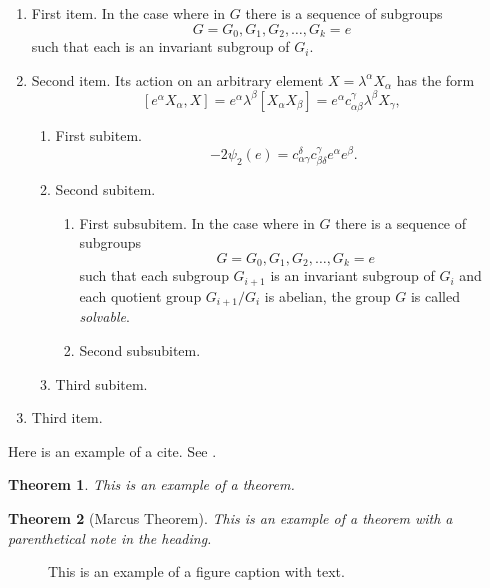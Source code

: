 \documentclass{mcom-l}
\newtheorem{theorem}{Theorem}[section]
\theoremstyle{definition}
\theoremstyle{remark}
\numberwithin{equation}{section}
\newcommand{\blankbox}[2]{%
  \parbox{\columnwidth}{\centering
    \setlength{\fboxsep}{0pt}%
    \fbox{\raisebox{0pt}[#2]{\hspace{#1}}}%
  }%
}
\begin{document}
\begin{enumerate}
\item First item.
In the case where in $G$ there is a sequence of subgroups
\[
G = G_0, G_1, G_2, \dots, G_k = e
\]
such that each is an invariant subgroup of $G_i$.

\item Second item.
Its action on an arbitrary element $X = \lambda^\alpha X_\alpha$ has the
form
\begin{equation}\label{eq:action}
[e^\alpha X_\alpha, X] = e^\alpha \lambda^\beta
[X_\alpha X_\beta] = e^\alpha c^\gamma_{\alpha \beta}
 \lambda^\beta X_\gamma,
\end{equation}

\begin{enumerate}
\item First subitem.
\[
- 2\psi_2(e) =  c_{\alpha \gamma}^\delta c_{\beta \delta}^\gamma
e^\alpha e^\beta.
\]

\item Second subitem.
\begin{enumerate}
\item First subsubitem.
In the case where in $G$ there is a sequence of subgroups
\[
G = G_0, G_1, G_2, \ldots, G_k = e
\]
such that each subgroup $G_{i+1}$ is an invariant subgroup of $G_i$ and
each quotient group $G_{i+1}/G_{i}$ is abelian, the group $G$ is called
\textit{solvable}.

\item Second subsubitem.
\end{enumerate}
\item Third subitem.
\end{enumerate}
\item Third item.
\end{enumerate}

Here is an example of a cite. See \cite{A}.

\begin{theorem}
This is an example of a theorem.
\end{theorem}

\begin{theorem}[Marcus Theorem]
This is an example of a theorem with a parenthetical note in the
heading.
\end{theorem}

\begin{figure}[tb]
\blankbox{.6\columnwidth}{5pc}
\caption{This is an example of a figure caption with text.}
\label{firstfig}
\end{figure}
\end{document}
